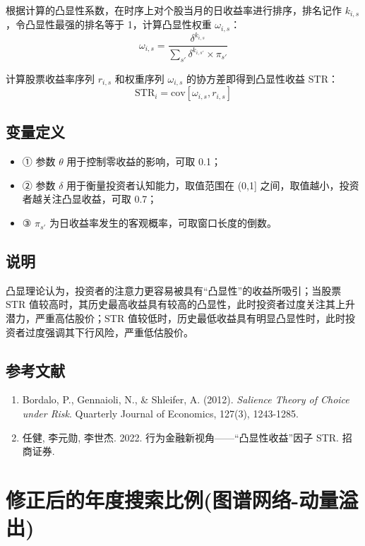 \documentclass{article}
\begin{document}
根据计算的凸显性系数，在时序上对个股当月的日收益率进行排序，排名记作 \( k_{i,s} \)，令凸显性最强的排名等于 1，计算凸显性权重 \( \omega_{i,s} \)：
\begin{equation}
    \omega_{i,s} = \frac{\delta^{k_{i,s}}}{\sum_{s'} \delta^{k_{i,s'}} \times \pi_{s'}}
\end{equation}

计算股票收益率序列 \( r_{i,s} \) 和权重序列 \( \omega_{i,s} \) 的协方差即得到凸显性收益 \( \mathrm{STR} \)：
\begin{equation}
    \mathrm{STR}_i = \mathrm{cov}[\omega_{i,s}, r_{i,s}]
\end{equation}

\subsection{变量定义}
\begin{itemize}
    \item ① 参数 \( \theta \) 用于控制零收益的影响，可取 0.1；
    \item ② 参数 \( \delta \) 用于衡量投资者认知能力，取值范围在 (0,1] 之间，取值越小，投资者越关注凸显收益，可取 0.7；
    \item ③ \( \pi_{s'} \) 为日收益率发生的客观概率，可取窗口长度的倒数。
\end{itemize}

\subsection{说明}
凸显理论认为，投资者的注意力更容易被具有“凸显性”的收益所吸引；当股票 \( \mathrm{STR} \) 值较高时，其历史最高收益具有较高的凸显性，此时投资者过度关注其上升潜力，严重高估股价；\( \mathrm{STR} \) 值较低时，历史最低收益具有明显凸显性时，此时投资者过度强调其下行风险，严重低估股价。

\subsection{参考文献}
\begin{enumerate}
    \item Bordalo, P., Gennaioli, N., \& Shleifer, A. (2012). \textit{Salience Theory of Choice under Risk}. Quarterly Journal of Economics, 127(3), 1243-1285.
    \item 任健, 李元勋, 李世杰. 2022. 行为金融新视角——“凸显性收益”因子 STR. 招商证券.
\end{enumerate}

\section{修正后的年度搜索比例(图谱网络-动量溢出)}
\end{document}
